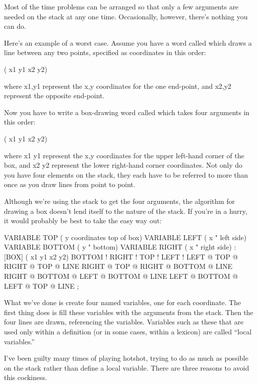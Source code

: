 Most of the time problems can be arranged so that only a few arguments
are needed on the stack at any one time. Occasionally, however, there's
nothing you can do.

Here's an example of a worst case. Assume you have a word called
 which draws a line between any two points, specified as coordinates
in this order:

\begin{Code}
( x1 y1 x2 y2)
\end{Code}
where x1,y1 represent the x,y coordinates for the one end-point, and
x2,y2 represent the opposite end-point.

Now you have to write a box-drawing word called \forth{[BOX]} which
takes four arguments in this order:

\begin{Code}
( x1 y1 x2 y2)
\end{Code}
where x1 y1 represent the x,y coordinates for the upper left-hand corner
of the box, and x2 y2 represent the lower right-hand corner coordinates.
Not only do you have four elements on the stack, they each have to
be referred to more than once as you draw lines from point to point.

Although we're using the stack to get the four arguments, the algorithm
for drawing a box doesn't lend itself to the nature of the stack. If you're
in a hurry, it would probably be best to take the easy way out:

\begin{Code}
VARIABLE TOP         ( y coordinates top of box)
VARIABLE LEFT        ( x     "       left side)
VARIABLE BOTTOM      ( y     "       bottom)
VARIABLE RIGHT       ( x     "       right side)
: [BOX]   ( x1 y1 x2 y2)   BOTTOM !  RIGHT !  TOP !  LEFT !
   LEFT @ TOP @  RIGHT @ TOP @  LINE
   RIGHT @ TOP @  RIGHT @ BOTTOM @  LINE
   RIGHT @ BOTTOM @  LEFT @ BOTTOM @  LINE
   LEFT @ BOTTOM @  LEFT @ TOP @  LINE ;
\end{Code}
What we've done is create four named variables, one for each coordinate.
The first thing \forth{[BOX]} does is fill these variables with the arguments from
the stack. Then the four lines are drawn, referencing the variables.
Variables such as these that are used only within a definition (or in some
cases, within a lexicon) are called ``local variables.''

I've been guilty many times of playing hotshot, trying to do as
much as possible on the stack rather than define a local variable. There
are three reasons to avoid this cockiness.


